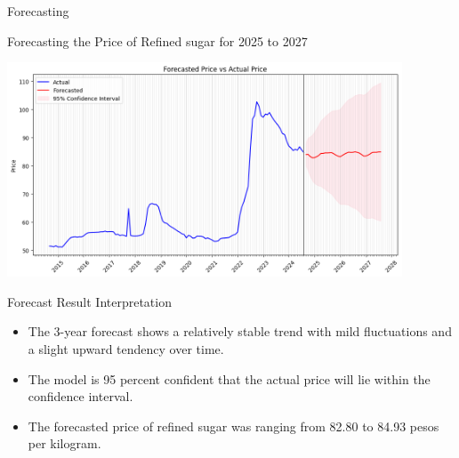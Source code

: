 \documentclass[12pt, aspectratio=169]{beamer}
\begin{document}
\begin{frame}
            \begin{tcolorbox}[colframe=theme, colback=theme]
        \begin{center}
            \Huge{Forecasting}
        \end{center}
    \end{tcolorbox}
\end{frame}

\begin{frame}{Forecasting the Price of Refined sugar for 2025 to 2027}
    \begin{center}
        \includegraphics[width = 0.88\textwidth]{forecasted_plot.png}
    \end{center}
\end{frame}

\begin{frame}{Forecast Result Interpretation}
\begin{itemize}
    \item The 3-year forecast shows a relatively stable trend with mild fluctuations and a slight upward tendency over time. 
    \item The model is 95 percent confident that the actual price will lie within the confidence interval. 
    \item The forecasted price of refined sugar was ranging from 82.80 to 84.93 pesos per kilogram.
\end{itemize}
\end{frame}
\end{document}
